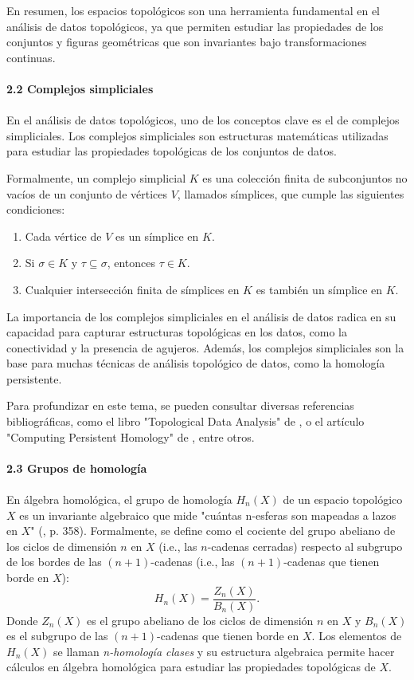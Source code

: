 En resumen, los espacios topológicos son una herramienta fundamental en el análisis de datos topológicos, ya que permiten estudiar las propiedades de los conjuntos y figuras geométricas que son invariantes bajo transformaciones continuas.\\\\

\textbf{2.2 Complejos simpliciales}\\\\
En el análisis de datos topológicos, uno de los conceptos clave es el de complejos simpliciales. Los complejos simpliciales son estructuras matemáticas utilizadas para estudiar las propiedades topológicas de los conjuntos de datos.

Formalmente, un complejo simplicial $K$ es una colección finita de subconjuntos no vacíos de un conjunto de vértices $V$, llamados símplices, que cumple las siguientes condiciones:

\begin{enumerate}[1.]
    \item Cada vértice de $V$ es un símplice en $K$.
    \item Si $\sigma \in K$ y $\tau \subseteq \sigma$, entonces $\tau \in K$.
    \item Cualquier intersección finita de símplices en $K$ es también un símplice en $K$.
\end{enumerate}

La importancia de los complejos simpliciales en el análisis de datos radica en su capacidad para capturar estructuras topológicas en los datos, como la conectividad y la presencia de agujeros. Además, los complejos simpliciales son la base para muchas técnicas de análisis topológico de datos, como la homología persistente.

Para profundizar en este tema, se pueden consultar diversas referencias bibliográficas, como el libro "Topological Data Analysis" de \cite{Carlsson2009TopologyAD}, o el artículo "Computing Persistent Homology" de \cite{Zomorodian2005}, entre otros.\\\\


\textbf{2.3 Grupos de homología}\\\\
En álgebra homológica, el grupo de homología $H_n(X)$ de un espacio topológico $X$ es un invariante algebraico que mide "cuántas n-esferas son mapeadas a lazos en $X$" (\cite{munkres2000topology}, p. 358). Formalmente, se define como el cociente del grupo abeliano de los ciclos de dimensión $n$ en $X$ (i.e., las $n$-cadenas cerradas) respecto al subgrupo de los bordes de las $(n+1)$-cadenas (i.e., las $(n+1)$-cadenas que tienen borde en $X$):
$$H_n(X)=\dfrac{Z_n(X)}{B_n(X)}.$$
Donde $Z_n(X)$ es el grupo abeliano de los ciclos de dimensión $n$ en $X$ y $B_n(X)$ es el subgrupo de las $(n+1)$-cadenas que tienen borde en $X$. Los elementos de $H_n(X)$ se llaman \textit{n-homología clases} y su estructura algebraica permite hacer cálculos en álgebra homológica para estudiar las propiedades topológicas de $X$.\\\\


